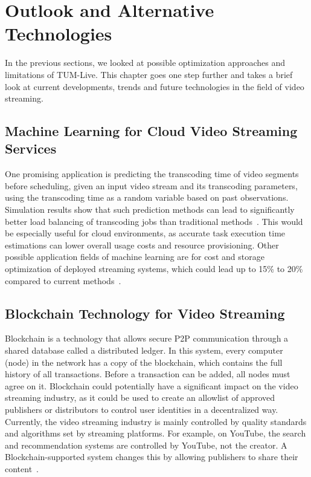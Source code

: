 
\chapter{Outlook and Alternative Technologies}\label{chapter:outlook}

In the previous sections, we looked at possible optimization approaches and limitations of TUM-Live. This chapter goes one step further and takes a brief look at current developments, trends and future technologies in the field of video streaming.

\section{Machine Learning for Cloud Video Streaming Services}

One promising application is predicting the transcoding time of video segments before scheduling, given an input video stream and its transcoding parameters, using the transcoding time as a random variable based on past observations. Simulation results show that such prediction methods can lead to significantly better load balancing of transcoding jobs than traditional methods~\parencite{cloud_predicting}.
This would be especially useful for cloud environments, as accurate task execution time estimations can lower overall usage costs and resource provisioning. Other possible application fields of machine learning are for cost and storage optimization of deployed streaming systems, which could lead up to 15\% to 20\% compared to current methods~\parencite{deep_learning_cloud}.

\section{Blockchain Technology for Video Streaming}

Blockchain is a technology that allows secure \ac{P2P} communication through a shared database called a distributed ledger. In this system, every computer (node) in the network has a copy of the blockchain, which contains the full history of all transactions. Before a transaction can be added, all nodes must agree on it.
Blockchain could potentially have a significant impact on the video streaming industry, as it could be used to create an allowlist of approved publishers or distributors to control user identities in a decentralized way.
Currently, the video streaming industry is mainly controlled by quality standards and algorithms set by streaming platforms. For example, on YouTube, the search and recommendation systems are controlled by YouTube, not the creator. A Blockchain-supported system changes this by allowing publishers to share their content~\parencite{cloud_streaming}.

